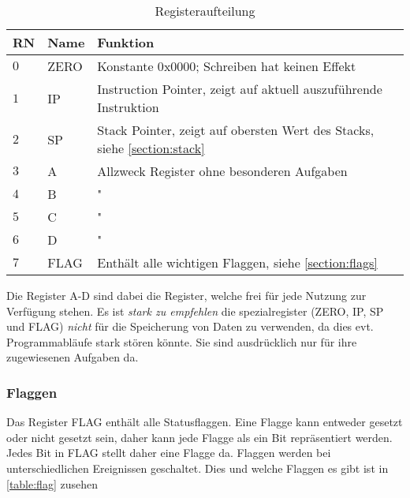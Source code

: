 \documentclass{scrartcl}
\begin{document}
\begin{center}
	\begin{table}[h]
		\caption{\label{table:register} Registeraufteilung}
		\begin{tabular}{l | l | l}
			RN & Name & Funktion\\
			\hline
			$0$ & ZERO & Konstante $0\text{x}0000$; Schreiben hat keinen Effekt\\
			$1$ & IP & Instruction Pointer, zeigt auf aktuell auszuführende Instruktion\\
			$2$ & SP & Stack Pointer, zeigt auf obersten Wert des Stacks, siehe \ref{section:stack} \\
			$3$ & A & Allzweck Register ohne besonderen Aufgaben \\
			$4$ & B & " \\
			$5$ & C & " \\
			$6$ & D & " \\
			$7$ & FLAG & Enthält alle wichtigen Flaggen, siehe \autoref{section:flags} \\
		\end{tabular}
	\end{table}
\end{center}

Die Register A-D sind dabei die Register, welche frei für jede Nutzung zur Verfügung stehen. Es ist \emph{stark zu empfehlen} die spezialregister (ZERO, IP, SP und FLAG) \emph{nicht} für die Speicherung von Daten zu verwenden, da dies evt. Programmabläufe stark stören könnte. Sie sind ausdrücklich nur für ihre zugewiesenen Aufgaben da.




\subsubsection{\label{section:flags}Flaggen}

Das Register FLAG enthält alle Statusflaggen. Eine Flagge kann entweder gesetzt oder nicht gesetzt sein, daher kann jede Flagge als ein Bit repräsentiert werden. Jedes Bit in FLAG stellt daher eine Flagge da. Flaggen werden bei unterschiedlichen Ereignissen geschaltet. Dies und welche Flaggen es gibt ist in \autoref{table:flag} zusehen
\end{document}
